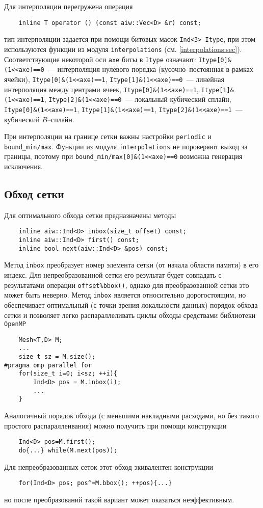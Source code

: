 Для интерполяции перегружена операция 
\begin{verbatim}
    inline T operator () (const aiw::Vec<D> &r) const;
\end{verbatim}
тип интерполяции задается при помощи битовых масок \verb'Ind<3> Itype', при этом используются функции из модуля \verb'interpolations' (см. \ref{interpolations:sec}).
Соответствующие некоторой оси \verb'axe' биты в \verb'Itype' означают: \verb'Itype[0]&(1<<axe)==0'~--- интерполяция нулевого порядка (кусочно--постоянная
в рамках ячейки), \verb'Itype[0]&(1<<axe)==1', \verb'Itype[1]&(1<<axe)==0'~--- линейная интерполяция между центрами ячеек,
\verb'Itype[0]&(1<<axe)==1', \verb'Itype[1]&(1<<axe)==1', \verb'Itype[2]&(1<<axe)==0'~--- локальный кубический сплайн,
\verb'Itype[0]&(1<<axe)==1', \verb'Itype[1]&(1<<axe)==1', \verb'Itype[2]&(1<<axe)==1'~--- кубический $B$--сплайн.

При интерполяции на границе сетки важны настройки \verb'periodic' и \verb'bound_min/max'. Функции из модуля \verb'interpolations' не пороверяют
выход за границы, поэтому при \verb'bound_min/max[0]&(1<<axe)==0' возможна генерация исключения.

\subsection{Обход сетки}
Для оптимального обхода сетки предназначены методы
\begin{verbatim}
    inline aiw::Ind<D> inbox(size_t offset) const;
    inline aiw::Ind<D> first() const;
    inline bool next(aiw::Ind<D> &pos) const;
\end{verbatim}
Метод \verb'inbox' преобразует номер элемента сетки (от начала области памяти) в его индекс. Для непреобразованной сетки
его результат будет совпадать с результатами операции \verb'offset%bbox()', 
однако для преобразованной сетки это может быть неверно. Метод \verb'inbox' является относительно дорогостоящим,
но обеспечивает оптимальный (с точки зрения локальности данных) порядок обхода сетки и позволяет
легко распараллеливать циклы обходы средствами библиотеки \verb'OpenMP'
\begin{verbatim}
    Mesh<T,D> M;
    ...
    size_t sz = M.size();
#pragma omp parallel for
    for(size_t i=0; i<sz; ++i){
        Ind<D> pos = M.inbox(i);
        ...
    }
\end{verbatim}

Аналогичный порядок обхода (с меньшими накладными расходами, но без такого простого распараллеивания) 
можно получить при помощи конструкции
\begin{verbatim}
    Ind<D> pos=M.first(); 
    do{...} while(M.next(pos));
\end{verbatim}
Для непреобразованных сеток этот обход экивалентен конструкции
\begin{verbatim}
    for(Ind<D> pos; pos^=M.bbox(); ++pos){...} 
\end{verbatim}
но после преобразований такой вариант может оказаться неэффективным.

